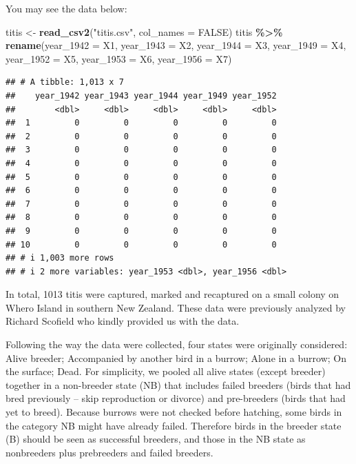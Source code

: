 \documentclass[
  12pt,
]{krantz}
\newenvironment{Shaded}{\begin{snugshade}}{\end{snugshade}}
\newcommand{\AttributeTok}[1]{\textcolor[rgb]{0.13,0.29,0.53}{#1}}
\newcommand{\ConstantTok}[1]{\textcolor[rgb]{0.56,0.35,0.01}{#1}}
\newcommand{\FunctionTok}[1]{\textcolor[rgb]{0.13,0.29,0.53}{\textbf{#1}}}
\newcommand{\NormalTok}[1]{#1}
\newcommand{\OtherTok}[1]{\textcolor[rgb]{0.56,0.35,0.01}{#1}}
\newcommand{\SpecialCharTok}[1]{\textcolor[rgb]{0.81,0.36,0.00}{\textbf{#1}}}
\newcommand{\StringTok}[1]{\textcolor[rgb]{0.31,0.60,0.02}{#1}}
\begin{document}
You may see the data below:

\begin{Shaded}
\begin{Highlighting}[]
\NormalTok{titis }\OtherTok{\textless{}{-}} \FunctionTok{read\_csv2}\NormalTok{(}\StringTok{"titis.csv"}\NormalTok{, }
                   \AttributeTok{col\_names =} \ConstantTok{FALSE}\NormalTok{)}
\NormalTok{titis }\SpecialCharTok{\%\textgreater{}\%}
  \FunctionTok{rename}\NormalTok{(}\AttributeTok{year\_1942 =}\NormalTok{ X1,}
         \AttributeTok{year\_1943 =}\NormalTok{ X2,}
         \AttributeTok{year\_1944 =}\NormalTok{ X3,}
         \AttributeTok{year\_1949 =}\NormalTok{ X4,}
         \AttributeTok{year\_1952 =}\NormalTok{ X5,}
         \AttributeTok{year\_1953 =}\NormalTok{ X6,}
         \AttributeTok{year\_1956 =}\NormalTok{ X7)}
\end{Highlighting}
\end{Shaded}

\begin{verbatim}
## # A tibble: 1,013 x 7
##    year_1942 year_1943 year_1944 year_1949 year_1952
##        <dbl>     <dbl>     <dbl>     <dbl>     <dbl>
##  1         0         0         0         0         0
##  2         0         0         0         0         0
##  3         0         0         0         0         0
##  4         0         0         0         0         0
##  5         0         0         0         0         0
##  6         0         0         0         0         0
##  7         0         0         0         0         0
##  8         0         0         0         0         0
##  9         0         0         0         0         0
## 10         0         0         0         0         0
## # i 1,003 more rows
## # i 2 more variables: year_1953 <dbl>, year_1956 <dbl>
\end{verbatim}

In total, 1013 titis were captured, marked and recaptured on a small colony on Whero Island in southern New Zealand. These data were previously analyzed by Richard Scofield who kindly provided us with the data.

Following the way the data were collected, four states were originally considered: Alive breeder; Accompanied by another bird in a burrow; Alone in a burrow; On the surface; Dead. For simplicity, we pooled all alive states (except breeder) together in a non-breeder state (NB) that includes failed breeders (birds that had bred previously -- skip reproduction or divorce) and pre-breeders (birds that had yet to breed). Because burrows were not checked before hatching, some birds in the category NB might have already failed. Therefore birds in the breeder state (B) should be seen as successful breeders, and those in the NB state as nonbreeders plus prebreeders and failed breeders.
\end{document}
